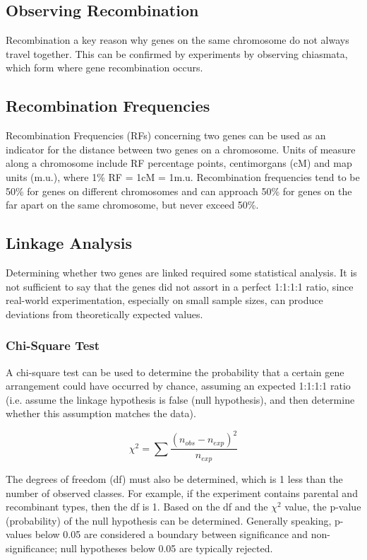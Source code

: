 \documentclass[12pt,titlepage]{article}
\begin{document}
    \subsection{Observing Recombination}
      Recombination a key reason why genes on the same chromosome do not always travel together. This can be confirmed by experiments by observing
      chiasmata, which form where gene recombination occurs.

    \subsection{Recombination Frequencies}
      Recombination Frequencies (RFs) concerning two genes can be used as an indicator for the distance between two genes on a chromosome. Units of measure
      along a chromosome include RF percentage points, centimorgans (cM) and map units (m.u.), where 1\% RF = 1cM = 1m.u. Recombination frequencies tend to
      be 50\% for genes on different chromosomes and can approach 50\% for genes on the far apart on the same chromosome, but never exceed 50\%.

    \subsection{Linkage Analysis}
      Determining whether two genes are linked required some statistical analysis. It is not sufficient to say that the genes did not assort in a perfect
      1:1:1:1 ratio, since real-world experimentation, especially on small sample sizes, can produce deviations from theoretically expected values.

      \subsubsection{Chi-Square Test}
        A chi-square test can be used to determine the probability that a certain gene arrangement could have occurred by chance, assuming an expected
        1:1:1:1 ratio (i.e. assume the linkage hypothesis is false (null hypothesis), and then determine whether this assumption matches the data).

        $$\chi^2 = \sum\frac{(n_{obs} - n_{exp})^2}{n_{exp}}$$

        The degrees of freedom (df) must also be determined, which is 1 less than the number of observed classes. For example, if the experiment contains
        parental and recombinant types, then the df is 1. Based on the df and the $\chi^2$ value, the p-value (probability) of the null hypothesis can be
        determined. Generally speaking, p-values below 0.05 are considered a boundary between significance and non-significance; null hypotheses below 0.05
        are typically rejected.
\end{document}
